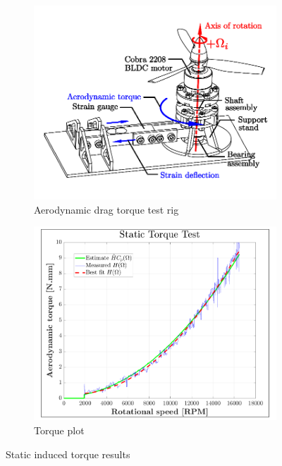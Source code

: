 \par
\begin{figure}[hbtp]
\begin{subfigure}{0.5\textwidth}
\centering
\includegraphics[width=\textwidth]{figs/torque-rig}
\vspace{-10pt}
\caption{Aerodynamic drag torque test rig}
\label{fig:torque-rig}
\end{subfigure}
\begin{subfigure}{0.5\textwidth}
\centering
\includegraphics[width=\textwidth]{graphs/torque-plot}
\vspace{-10pt}
\caption{Torque plot}
\label{fig:torque-plot}
\end{subfigure}
\vspace{-4pt}
\caption{Static induced torque results}
\label{fig:torques}
\vspace{-16pt}
\end{figure}
